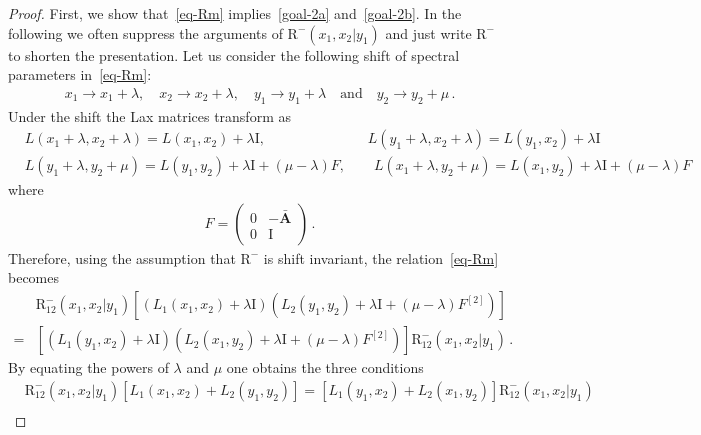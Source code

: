 \documentclass[11pt]{article}
\numberwithin{equation}{section}
\newcommand{\OAD}{\mathbf{\bar{A}}}
\newcommand{\ID}{\mathrm{I}}
\newcommand{\abrOSCR}{\mathrm{R}}
\begin{document}
\begin{proof}
    
 First, we show that~\eqref{eq-Rm} implies~\eqref{goal-2a} and~\eqref{goal-2b}.
In the following we often suppress the arguments of $\abrOSCR^{-}(x_{1},x_{2}|y_{1})$ and just write $\abrOSCR^{-}$ to shorten the presentation.
Let us consider the following shift of spectral parameters in~\eqref{eq-Rm}:
\begin{equation}\label{variable-shift}
	\begin{split}
		x_{1}\to x_{1}+\lambda,\quad x_{2}\to x_{2}+\lambda,\quad y_{1}\to y_{1}+\lambda \quad \text{and}\quad y_{2}\to y_{2}+\mu\,.
	\end{split}
\end{equation}
Under the shift the Lax matrices  transform as
\begin{equation}
	\begin{split}
		&L(x_{1}+\lambda,x_{2}+\lambda)= L(x_{1},x_{2})+\lambda\ID,\;\quad\qquad\qquad\qquad L(y_{1}+\lambda,x_{2}+\lambda)= L(y_{1},x_{2})+\lambda \ID\\
		&L(y_{1}+\lambda,y_{2}+\mu)=L(y_{1},y_{2})+\lambda\ID+(\mu-\lambda)F,\qquad 	L(x_{1}+\lambda,y_{2}+\mu)= L(x_{1},y_{2})+\lambda\ID+(\mu-\lambda)F
	\end{split}
\end{equation}
where
						\begin{eqnarray}
	F=\begin{pmatrix}
		0&-\OAD\\
		0&\ID
	\end{pmatrix}\,.
\end{eqnarray}
Therefore, using the assumption that $\abrOSCR^{-}$ is shift invariant, the relation~\eqref{eq-Rm} becomes
\begin{equation}\label{consequence-shift-1}
	\begin{split}
		&\abrOSCR_{12}^{-}(x_1,x_2|y_1)\left[\left(L_{1}(x_{1},x_{2})+\lambda\ID\right)\left(L_{2}(y_{1},y_{2})+\lambda\ID+(\mu-\lambda)F^{[2]}\right)\right]\\
		=&
		\left[\left(L_{1}(y_{1},x_{2})+\lambda\ID\right)\left(L_{2}(x_{1},y_{2})+\lambda\ID+(\mu-\lambda)F^{[2]}\right)\right]\abrOSCR_{12}^{-}(x_1,x_2|y_1)\,.
	\end{split}
\end{equation}
By equating the powers of $\lambda$ and $\mu$ one obtains the three conditions
	\begin{align}
			&\abrOSCR_{12}^{-}(x_1,x_2|y_1)\left[L_{1}(x_{1},x_{2})+L_{2}(y_{1},y_{2})\right]=\left[L_{1}(y_{1},x_{2})+L_{2}(x_{1},y_{2})\right]\abrOSCR_{12}^{-}(x_1,x_2|y_1)\label{list-1-first}\\

\end{align}
\end{proof}
\end{document}
